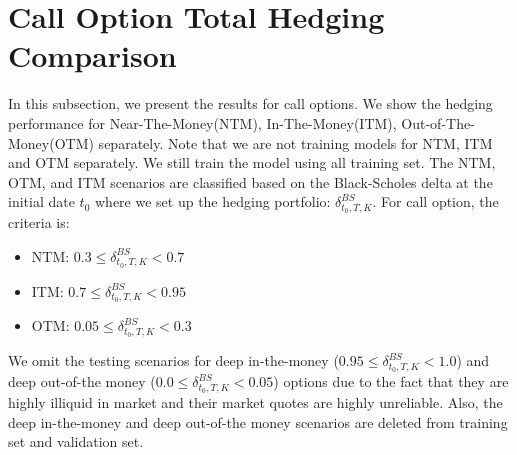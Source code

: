 \documentclass[letterpaper,12pt,titlepage,oneside,final]{book}
\numberwithin{equation}{section}
\theoremstyle{definition}
\begin{document}
\section{Call Option Total Hedging Comparison}
In this subsection, we present the results for call options. We show the hedging performance for Near-The-Money(NTM), In-The-Money(ITM), Out-of-The-Money(OTM) separately. Note that we are not training  models for NTM, ITM and OTM separately. We still train the model using all training set. The NTM, OTM, and ITM scenarios are classified based on the Black-Scholes delta at the initial date $t_0$ where we set up the hedging portfolio: $\delta^{BS}_{t_0,T,K}$. For call option, the criteria is:
\begin{itemize}
	\item  NTM: $0.3 \leq \delta^{BS}_{t_0,T,K} <0.7$
	\item  ITM: $0.7 \leq \delta^{BS}_{t_0,T,K} <0.95$
	\item  OTM:  $0.05 \leq \delta^{BS}_{t_0,T,K} <0.3$
\end{itemize}
We omit the testing scenarios for deep in-the-money ($0.95 \leq \delta^{BS}_{t_0,T,K} <1.0$) and deep out-of-the money ($0.0 \leq \delta^{BS}_{t_0,T,K} <0.05$) options due to the fact that they are highly illiquid in market and their market quotes are highly unreliable. Also, the deep in-the-money and deep out-of-the money scenarios are deleted from training set and validation set.
\end{document}

